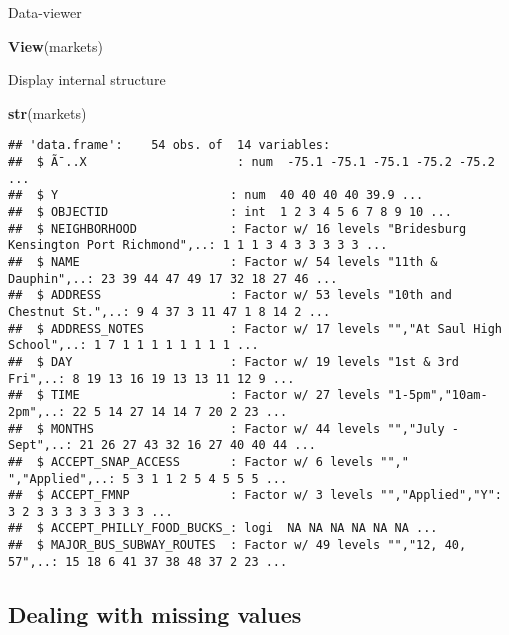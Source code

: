 \documentclass[]{article}
\newenvironment{Shaded}{\begin{snugshade}}{\end{snugshade}}
\newcommand{\KeywordTok}[1]{\textcolor[rgb]{0.13,0.29,0.53}{\textbf{#1}}}
\newcommand{\NormalTok}[1]{#1}
\begin{document}
Data-viewer

\begin{Shaded}
\begin{Highlighting}[]
\KeywordTok{View}\NormalTok{(markets)}
\end{Highlighting}
\end{Shaded}

Display internal structure

\begin{Shaded}
\begin{Highlighting}[]
\KeywordTok{str}\NormalTok{(markets) }
\end{Highlighting}
\end{Shaded}

\begin{verbatim}
## 'data.frame':    54 obs. of  14 variables:
##  $ Ã¯..X                     : num  -75.1 -75.1 -75.1 -75.2 -75.2 ...
##  $ Y                        : num  40 40 40 40 39.9 ...
##  $ OBJECTID                 : int  1 2 3 4 5 6 7 8 9 10 ...
##  $ NEIGHBORHOOD             : Factor w/ 16 levels "Bridesburg Kensington Port Richmond",..: 1 1 1 3 4 3 3 3 3 3 ...
##  $ NAME                     : Factor w/ 54 levels "11th & Dauphin",..: 23 39 44 47 49 17 32 18 27 46 ...
##  $ ADDRESS                  : Factor w/ 53 levels "10th and Chestnut St.",..: 9 4 37 3 11 47 1 8 14 2 ...
##  $ ADDRESS_NOTES            : Factor w/ 17 levels "","At Saul High School",..: 1 7 1 1 1 1 1 1 1 1 ...
##  $ DAY                      : Factor w/ 19 levels "1st & 3rd Fri",..: 8 19 13 16 19 13 13 11 12 9 ...
##  $ TIME                     : Factor w/ 27 levels "1-5pm","10am-2pm",..: 22 5 14 27 14 14 7 20 2 23 ...
##  $ MONTHS                   : Factor w/ 44 levels "","July - Sept",..: 21 26 27 43 32 16 27 40 40 44 ...
##  $ ACCEPT_SNAP_ACCESS       : Factor w/ 6 levels ""," ","Applied",..: 5 3 1 1 2 5 4 5 5 5 ...
##  $ ACCEPT_FMNP              : Factor w/ 3 levels "","Applied","Y": 3 2 3 3 3 3 3 3 3 3 ...
##  $ ACCEPT_PHILLY_FOOD_BUCKS_: logi  NA NA NA NA NA NA ...
##  $ MAJOR_BUS_SUBWAY_ROUTES  : Factor w/ 49 levels "","12, 40, 57",..: 15 18 6 41 37 38 48 37 2 23 ...
\end{verbatim}

\subsection{Dealing with missing
values}\label{dealing-with-missing-values}
\end{document}
